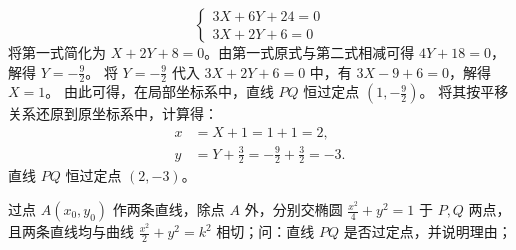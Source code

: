 \begin{solution}
\[ \begin{cases} 3X + 6Y + 24 = 0 \\ 3X + 2Y + 6 = 0 \end{cases} \]
将第一式简化为 $X + 2Y + 8 = 0$。由第一式原式与第二式相减可得 $4Y + 18 = 0$，解得 $Y = -\frac{9}{2}$。
将 $Y = -\frac{9}{2}$ 代入 $3X + 2Y + 6 = 0$ 中，有 $3X - 9 + 6 = 0$，解得 $X = 1$。
由此可得，在局部坐标系中，直线 $PQ$ 恒过定点 $\left(1, -\frac{9}{2}\right)$。
将其按平移关系还原到原坐标系中，计算得：
\begin{align*}
x &= X + 1 = 1 + 1 = 2, \\
y &= Y + \frac{3}{2} = -\frac{9}{2} + \frac{3}{2} = -3.
\end{align*}
直线 $PQ$ 恒过定点 $(2, -3)$。
\end{solution}


\begin{example}
过点 \(A(x_0,y_0)\) 作两条直线，除点 \(A\) 外，分别交椭圆 \(\frac{x^2}{4} + y^2 = 1\) 于 \(P,Q\) 两点，且两条直线均与曲线 \(\frac{x^2}{2} + y^2 = k^2\) 相切；问：直线 \(PQ\) 是否过定点，并说明理由；
\end{example}
